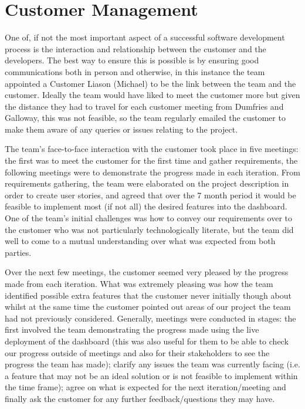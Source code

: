 \documentclass{l3proj}
\begin{document}

\section{Customer Management}
\label{sec:customer-management}

One of, if not the most important aspect of a successful software development process is the interaction and relationship between the customer and the developers. The best way to ensure this is possible is by ensuring good communications both in person and otherwise, in this instance the team appointed a Customer Liason (Michael) to be the link between the team and the customer. Ideally the team would have liked to meet the customer more but given the distance they had to travel for each customer meeting from Dumfries and Galloway, this was not feasible, so the team regularly emailed the customer to make them aware of any queries or issues relating to the project.

The team's face-to-face interaction with the customer took place in five meetings: the first was to meet the customer for the first time and gather requirements, the following meetings were to demonstrate the progress made in each iteration. From requirements gathering, the team were elaborated on the project description in order to create user stories, and agreed that over the 7 month period it would be feasible to implement most (if not all) the desired features into the dashboard. One of the team's initial challenges was how to convey our requirements over to the customer who was not particularly technologically literate, but the team did well to come to a mutual understanding over what was expected from both parties.

Over the next few meetings, the customer seemed very pleased by the progress made from each iteration. What was extremely pleasing was how the team identified possible extra features that the customer never initially though about whilst at the same time the customer pointed out areas of our project the team had not previously considered. Generally, meetings were conducted in stages: the first involved the team demonstrating the progress made using the live deployment of the dashboard (this was also useful for them to be able to check our progress outside of meetings and also for their stakeholders to see the progress the team has made); clarify any issues the team was currently facing (i.e. a feature that may not be an ideal solution or is not feasible to implement within the time frame); agree on what is expected for the next iteration/meeting and finally ask the customer for any further feedback/questions they may have.
\end{document}
